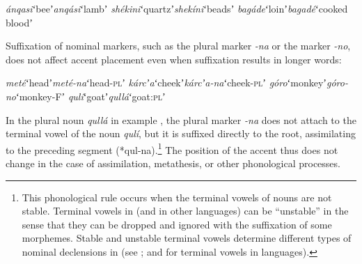 \documentclass[output=paper,modfonts,nonflat,hidelinks]{langsci/langscibook}
\begin{document}
\begin{exe}
	\ex \begin{xlist}
	\ex \textit{ánqasi}\hspace{8mm}ʻbeeʼ\hspace{11mm}\textit{anqási}\hspace{6mm}ʻlambʼ
    \ex \textit{shékini}\hspace{8mm}ʻquartzʼ\hspace{6mm}\textit{shekíni}\hspace{5mm}ʻbeadsʼ
    \ex \textit{bagáde}\hspace{8mm}ʻloinʼ\hspace{10mm}\textit{bagadé}\hspace{5mm}ʻcooked bloodʼ
\end{xlist} \label{ex:Petrollino:minimalpairs2}
\end{exe}


Suffixation of nominal markers, such as the plural marker \textit{-na} or the   marker \textit{-no}, does not affect accent placement even when suffixation results in longer words:

\newpage 
\begin{exe} 
	\ex \label{ex:Petrollino:nominflections} \begin{xlist}
	\ex \textit{meté}\hspace{12mm}ʻheadʼ\hspace{9mm}\textit{meté-na}\hspace{4mm}ʻhead-\textsc{pl}ʼ
    \ex \textit{kárcʼa}\hspace{10mm}ʻcheekʼ\hspace{8mm}\textit{kárcʼa-na}\hspace{2mm}ʻcheek-\textsc{pl}ʼ
    \ex \textit{góro}\hspace{13mm}ʻmonkeyʼ\hspace{4mm}\textit{góro-no}\hspace{5mm}ʻmonkey-Fʼ
    \ex \textit{qulí}\hspace{13mm}ʻgoatʼ\hspace{10mm}\textit{qullá}\hspace{9mm}ʻgoat:\textsc{pl}ʼ\label{ex:Petrollino:qullá}
\end{xlist}
\end{exe}
In the plural noun \textit{qullá} in example , the plural marker \textit{-na} does not attach to the terminal vowel of the noun \textit{qulí}, but it is suffixed directly to the root, assimilating to the preceding  segment (*qul-na).\footnote{This phonological rule occurs when the terminal vowels of nouns are not stable. Terminal vowels in  (and in other  languages) can be “unstable” in the sense that they can be dropped and ignored with the suffixation of some morphemes. Stable and unstable terminal vowels determine different types of nominal declensions in  (see \citealt[73-77]{Petrollino2016}; \citealt{Hayward1987} and \citealt{Azeb2012} for terminal vowels in  languages).} The position of the accent thus does not change in the case of assimilation, metathesis, or other phonological processes.
\end{document}
